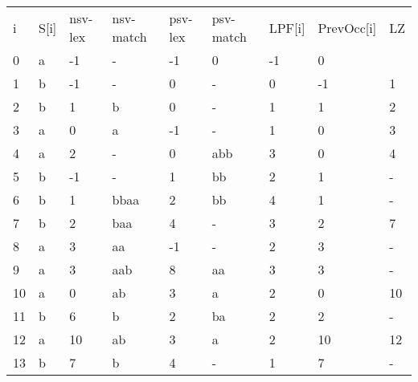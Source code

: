 \begin{table}[h]
\begin{tabular}{lllllllll}
i  & S{[}i{]} & nsv-lex & nsv-match & psv-lex & psv-match & LPF{[}i{]} & PrevOcc{[}i{]} & LZ \\
0  & a        & -1      & -         & -1      & 0         & -1         & 0              &    \\
1  & b        & -1      & -         & 0       & -         & 0          & -1             & 1  \\
2  & b        & 1       & b         & 0       & -         & 1          & 1              & 2  \\
3  & a        & 0       & a         & -1      & -         & 1          & 0              & 3  \\
4  & a        & 2       & -         & 0       & abb       & 3          & 0              & 4  \\
5  & b        & -1      & -         & 1       & bb        & 2          & 1              & -  \\
6  & b        & 1       & bbaa      & 2       & bb        & 4          & 1              & -  \\
7  & b        & 2       & baa       & 4       & -         & 3          & 2              & 7  \\
8  & a        & 3       & aa        & -1      & -         & 2          & 3              & -  \\
9  & a        & 3       & aab       & 8       & aa        & 3          & 3              & -  \\
10 & a        & 0       & ab        & 3       & a         & 2          & 0              & 10 \\
11 & b        & 6       & b         & 2       & ba        & 2          & 2              & -  \\
12 & a        & 10      & ab        & 3       & a         & 2          & 10             & 12 \\
13 & b        & 7       & b         & 4       & -         & 1          & 7              & - 
\end{tabular}
\end{table}

